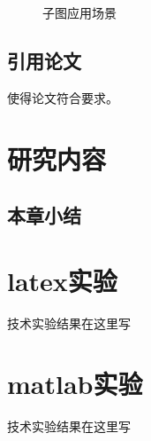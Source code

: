 \documentclass[bachelor,nocolorlinks, printoneside]{seuthesis} %
\begin{document}
\begin{Main}
\begin{figure}
\centering
{}
\caption{子图应用场景}
\end{figure}

\section{引用论文}
使得论文符合要求\cite{Yao:2015ix}\cite{seucover}\cite{test1}\cite{test}\cite{R1}。

\chapter{研究内容}
\section{本章小结}

\end{Main} %



\begin{Appendix}{}
\chapter{latex实验}
技术实验结果在这里写
\chapter{matlab实验}
技术实验结果在这里写
\end{Appendix}
\end{document}
